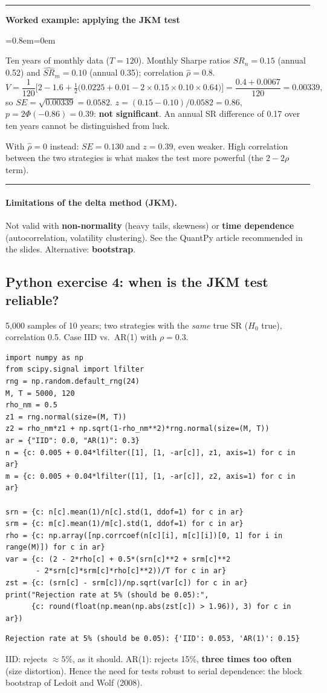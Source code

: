 \documentclass[11pt,a4paper]{report}
\newenvironment{notebox}[1]
  {\par\medskip\Needspace{6\baselineskip}\noindent\rule{\linewidth}{0.4pt}\par\nopagebreak
   \noindent\textbf{#1}\par\nopagebreak
   \begin{list}{}{\leftmargin=0.8em\rightmargin=0em\topsep=2pt}\item[]}
  {\end{list}\nopagebreak\noindent\rule{\linewidth}{0.4pt}\par\medskip}
\newenvironment{workedex}[1][]{\begin{notebox}{Worked example#1}}{\end{notebox}}
\begin{document}
\begin{workedex}[: applying the JKM test]
Ten years of monthly data ($T=120$). Monthly Sharpe ratios $\widehat{SR}_n=0.15$
(annual 0.52) and $\widehat{SR}_m=0.10$ (annual 0.35); correlation $\hat\rho=0.8$.
\[
V=\frac{1}{120}\Big[2-1.6+\tfrac12\big(0.0225+0.01-2\times0.15\times0.10\times0.64\big)\Big]
=\frac{0.4+0.0067}{120}=0.00339,
\]
so $SE=\sqrt{0.00339}=0.0582$.
$z=(0.15-0.10)/0.0582=0.86$, $p=2\Phi(-0.86)=0.39$: \textbf{not significant}.
An annual SR difference of 0.17 over ten years cannot be distinguished from luck.

With $\hat\rho=0$ instead: $SE=0.130$ and $z=0.39$, even weaker. High correlation
between the two strategies is what makes the test more powerful (the $2-2\rho$ term).
\end{workedex}
\paragraph{Limitations of the delta method (JKM).} Not valid with
\textbf{non-normality} (heavy tails, skewness) or \textbf{time dependence}
(autocorrelation, volatility clustering). See the QuantPy article recommended in
the slides. Alternative: \textbf{bootstrap}.

\subsection*{Python exercise 4: when is the JKM test reliable?}
5{,}000 samples of 10 years; two strategies with the \emph{same} true SR
($H_0$ true), correlation 0.5. Case IID vs.\ AR(1) with $\rho=0.3$.
\begin{lstlisting}
import numpy as np
from scipy.signal import lfilter
rng = np.random.default_rng(24)
M, T = 5000, 120
rho_nm = 0.5
z1 = rng.normal(size=(M, T))
z2 = rho_nm*z1 + np.sqrt(1-rho_nm**2)*rng.normal(size=(M, T))
ar = {"IID": 0.0, "AR(1)": 0.3}
n = {c: 0.005 + 0.04*lfilter([1], [1, -ar[c]], z1, axis=1) for c in ar}
m = {c: 0.005 + 0.04*lfilter([1], [1, -ar[c]], z2, axis=1) for c in ar}

srn = {c: n[c].mean(1)/n[c].std(1, ddof=1) for c in ar}
srm = {c: m[c].mean(1)/m[c].std(1, ddof=1) for c in ar}
rho = {c: np.array([np.corrcoef(n[c][i], m[c][i])[0, 1] for i in range(M)]) for c in ar}
var = {c: (2 - 2*rho[c] + 0.5*(srn[c]**2 + srm[c]**2
       - 2*srn[c]*srm[c]*rho[c]**2))/T for c in ar}
zst = {c: (srn[c] - srm[c])/np.sqrt(var[c]) for c in ar}
print("Rejection rate at 5% (should be 0.05):",
      {c: round(float(np.mean(np.abs(zst[c]) > 1.96)), 3) for c in ar})
\end{lstlisting}
\begin{lstlisting}[style=out]
Rejection rate at 5% (should be 0.05): {'IID': 0.053, 'AR(1)': 0.15}
\end{lstlisting}
IID: rejects $\approx5\%$, as it should. AR(1): rejects 15\%, \textbf{three
times too often} (size distortion). Hence the need for tests robust to serial
dependence: the block bootstrap of Ledoit and Wolf (2008).
\end{document}
